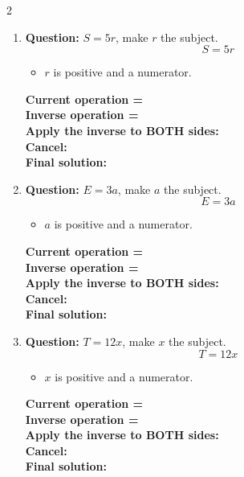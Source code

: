 \documentclass[11pt]{article}
\begin{document}
\begin{multicols}{2}
\begin{enumerate}[leftmargin=*, itemsep=10pt]
\item \textbf{Question:} \( S = 5r \), make \( r \) the subject.
\[
S=5r
\]
\begin{itemize}[leftmargin=*, itemsep=2pt]
\item \(r\) is positive and a numerator.
\end{itemize}
\textbf{Current operation =} \\[1cm]
\textbf{Inverse operation =} \\[1cm]
\textbf{Apply the inverse to BOTH sides:} \\[1.5cm]
\textbf{Cancel:} \\[1.5cm]
\textbf{Final solution:}\\[1.5cm]

\newpage
\item \textbf{Question:} \( E = 3a \), make \( a \) the subject.
\[
E=3a
\]
\begin{itemize}[leftmargin=*, itemsep=2pt]
\item \(a\) is positive and a numerator.
\end{itemize}
\textbf{Current operation =} \\[1cm]
\textbf{Inverse operation =} \\[1cm]
\textbf{Apply the inverse to BOTH sides:} \\[1.5cm]
\textbf{Cancel:} \\[1.5cm]
\textbf{Final solution:}\\[1.5cm]

\item \textbf{Question:} \( T = 12x \), make \( x \) the subject.
\[
T=12x
\]
\begin{itemize}[leftmargin=*, itemsep=2pt]
\item \(x\) is positive and a numerator.
\end{itemize}
\textbf{Current operation =} \\[1cm]
\textbf{Inverse operation =} \\[1cm]
\textbf{Apply the inverse to BOTH sides:} \\[1.5cm]
\textbf{Cancel:} \\[1.5cm]
\textbf{Final solution:}\\[1.5cm]


\end{enumerate}
\end{multicols}
\end{document}

